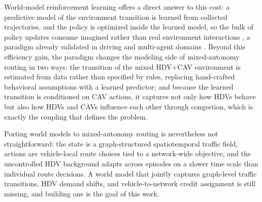 World-model reinforcement learning offers a direct answer to this cost: a predictive model of the environment transition is learned from collected trajectories, and the policy is optimized inside the learned model, so the bulk of policy updates consume imagined rather than real environment interactions \cite{hafnerdream,hafnermastering,hafner2025mastering}, a paradigm already validated in driving and multi-agent domains \cite{mamba,li2024think2drive,yang2026raw2drive}. Beyond this efficiency gain, the paradigm changes the modeling side of mixed-autonomy routing in two ways: the transition of the mixed HDV+CAV environment is estimated from data rather than specified by rules, replacing hand-crafted behavioral assumptions with a learned predictor; and because the learned transition is conditioned on CAV actions, it captures not only how HDVs behave but also how HDVs and CAVs influence each other through congestion, which is exactly the coupling that defines the problem.

Porting world models to mixed-autonomy routing is nevertheless not straightforward: the state is a graph-structured spatiotemporal traffic field, actions are vehicle-local route choices tied to a network-wide objective, and the uncontrolled HDV background adapts across episodes on a slower time scale than individual route decisions. A world model that jointly captures graph-level traffic transitions, HDV demand shifts, and vehicle-to-network credit assignment is still missing, and building one is the goal of this work.

